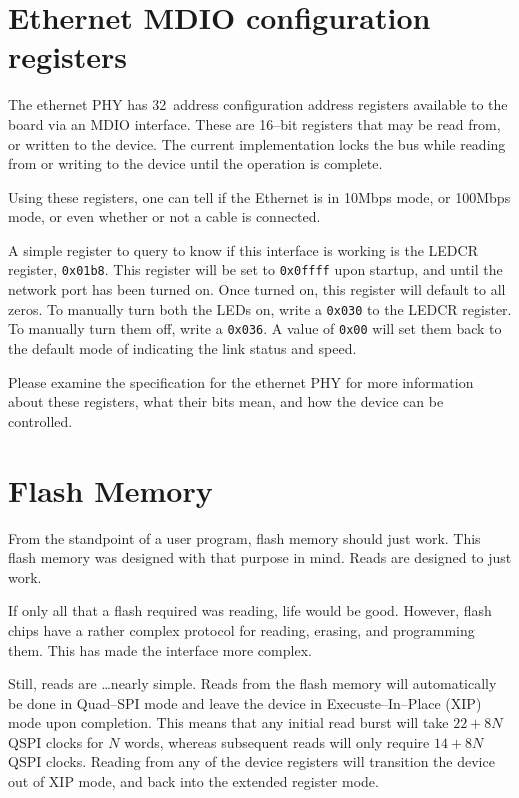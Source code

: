 \documentclass{gqtekspec}
\begin{document}
\section{Ethernet MDIO configuration registers}
The ethernet PHY has 32~address configuration address registers available
to the board via an MDIO interface.  These are 16--bit registers that may be
read from, or written to the device.  The current implementation locks the
bus while reading from or writing to the device until the operation is
complete. 

Using these registers, one can tell if the Ethernet is in 10Mbps mode, or
100Mbps mode, or even whether or not a cable is connected.

A simple register to query to know if this interface is working is the LEDCR
register, {\tt 0x01b8}.  
This register will be set to {\tt 0x0ffff} upon startup, and until the network
port has been turned on.  Once turned on, this register will default to all
zeros.  To manually turn both the LEDs on, write a {\tt 0x030} to the LEDCR
register.  To manually turn them off, write a {\tt 0x036}.  A value of
{\tt 0x00} will set them back to the default mode of indicating the link
status and speed.

Please examine the specification for the ethernet PHY for more information
about these registers, what their bits mean, and how the device can be
controlled.

\section{Flash Memory}
From the standpoint of a user program, flash memory should just work.  This
flash memory was designed with that purpose in mind.  Reads are designed to
just work.

If only all that a flash required was reading, life would be good.  However,
flash chips have a rather complex protocol for reading, erasing, and programming
them.  This has made the interface more complex.

Still, reads are \ldots nearly simple.  Reads from the flash 
memory will automatically be done in Quad--SPI mode and leave the device in
Execuste--In--Place (XIP) mode upon completion.  This means that any initial
read burst will take $22+8N$ QSPI clocks for $N$ words, whereas subsequent
reads will only require $14+8N$ QSPI clocks.  Reading from any of the device
registers will transition the device out of XIP mode, and back into the
extended register mode.
\end{document}
